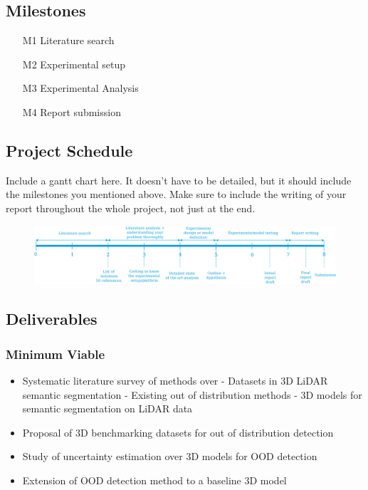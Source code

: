 \documentclass[thesis]{mas_proposal}
\begin{document}
\subsection{Milestones}
\begin{enumerate}
    \item[M1] Literature search
    \item[M2] Experimental setup
    \item[M3] Experimental Analysis
    \item[M4] Report submission
\end{enumerate}

\subsection{Project Schedule}
Include a gantt chart here. It doesn't have to be detailed, but it should include the milestones you mentioned above.
Make sure to include the writing of your report throughout the whole project, not just at the end.

\begin{figure}[h!]
    \caption{}
    \includegraphics[width=\textwidth]{images/rnd_deliverable_timeline}
    \label{}
\end{figure}

\subsection{Deliverables}
\subsubsection*{Minimum Viable}

\begin{itemize}
    \item Systematic literature survey of methods over
        \subitem- Datasets in 3D LiDAR semantic segmentation
        \subitem- Existing out of distribution methods 
        \subitem- 3D models for semantic segmentation on LiDAR data
    \item Proposal of 3D benchmarking datasets for out of distribution detection
    \item Study of uncertainty estimation over 3D models for OOD detection
    \item Extension of OOD detection method to a baseline 3D model
\end{itemize}
\end{document}

